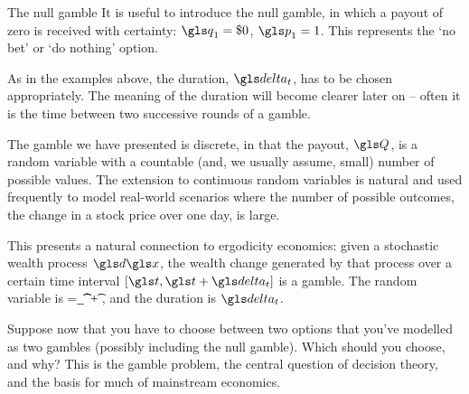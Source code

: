 
\begin{example}{The null gamble}
It is useful to introduce the null gamble, in which a payout of zero is received 
with certainty: $\q_1=\$0$, $\p_1=1$. This represents the `no bet' or `do nothing' option.

As in the examples above, the duration, $\dt$, has to be chosen appropriately. 
The meaning of the duration will become clearer later on -- often it is the time 
between two successive rounds of a gamble.
\end{example}

The gamble we have 
presented is discrete, in that the payout, $\Q$, is a random variable with a 
countable (and, we usually assume, small) number of possible values. 
The extension to continuous random variables is natural and used frequently 
to model real-world scenarios where the number of possible outcomes, \eg the change 
in a stock price over one day, is large.

This presents a natural connection to ergodicity economics: given a stochastic wealth 
process $\gd\x$, the wealth change generated by that process over a certain time 
interval $[\t,\t+\dt]$ is a gamble. The random variable is 
\be
\Q=\int_\t^{\t+\dt} \gd\x,
\ee and the duration is $\dt$.

Suppose now that you have to choose between two options that you've modelled 
as two gambles (possibly including the null gamble). Which should you choose, 
and why? This is the gamble problem, the central question of decision theory, and 
the basis for much of mainstream economics.


